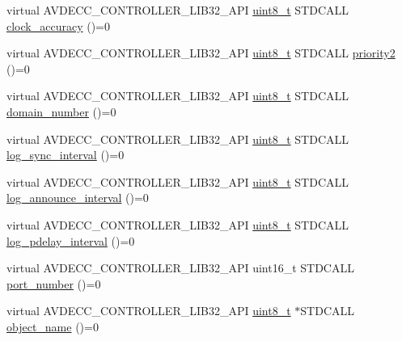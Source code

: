 \begin{DoxyCompactItemize}
\item 
virtual A\+V\+D\+E\+C\+C\+\_\+\+C\+O\+N\+T\+R\+O\+L\+L\+E\+R\+\_\+\+L\+I\+B32\+\_\+\+A\+PI \hyperlink{stdint_8h_aba7bc1797add20fe3efdf37ced1182c5}{uint8\+\_\+t} S\+T\+D\+C\+A\+LL \hyperlink{classavdecc__lib_1_1avb__interface__descriptor__response_acc3099d6effb85acd06976886ec7e9ec}{clock\+\_\+accuracy} ()=0
\item 
virtual A\+V\+D\+E\+C\+C\+\_\+\+C\+O\+N\+T\+R\+O\+L\+L\+E\+R\+\_\+\+L\+I\+B32\+\_\+\+A\+PI \hyperlink{stdint_8h_aba7bc1797add20fe3efdf37ced1182c5}{uint8\+\_\+t} S\+T\+D\+C\+A\+LL \hyperlink{classavdecc__lib_1_1avb__interface__descriptor__response_a8c7f27f9936745eaf35d7b1e3d2a312a}{priority2} ()=0
\item 
virtual A\+V\+D\+E\+C\+C\+\_\+\+C\+O\+N\+T\+R\+O\+L\+L\+E\+R\+\_\+\+L\+I\+B32\+\_\+\+A\+PI \hyperlink{stdint_8h_aba7bc1797add20fe3efdf37ced1182c5}{uint8\+\_\+t} S\+T\+D\+C\+A\+LL \hyperlink{classavdecc__lib_1_1avb__interface__descriptor__response_afe2d2e5bfaef60c810adead040d141c3}{domain\+\_\+number} ()=0
\item 
virtual A\+V\+D\+E\+C\+C\+\_\+\+C\+O\+N\+T\+R\+O\+L\+L\+E\+R\+\_\+\+L\+I\+B32\+\_\+\+A\+PI \hyperlink{stdint_8h_aba7bc1797add20fe3efdf37ced1182c5}{uint8\+\_\+t} S\+T\+D\+C\+A\+LL \hyperlink{classavdecc__lib_1_1avb__interface__descriptor__response_a7b48b137474a0b9cc94dbc77cf807921}{log\+\_\+sync\+\_\+interval} ()=0
\item 
virtual A\+V\+D\+E\+C\+C\+\_\+\+C\+O\+N\+T\+R\+O\+L\+L\+E\+R\+\_\+\+L\+I\+B32\+\_\+\+A\+PI \hyperlink{stdint_8h_aba7bc1797add20fe3efdf37ced1182c5}{uint8\+\_\+t} S\+T\+D\+C\+A\+LL \hyperlink{classavdecc__lib_1_1avb__interface__descriptor__response_aa99e9ae52d9f883d9d7128e273a74293}{log\+\_\+announce\+\_\+interval} ()=0
\item 
virtual A\+V\+D\+E\+C\+C\+\_\+\+C\+O\+N\+T\+R\+O\+L\+L\+E\+R\+\_\+\+L\+I\+B32\+\_\+\+A\+PI \hyperlink{stdint_8h_aba7bc1797add20fe3efdf37ced1182c5}{uint8\+\_\+t} S\+T\+D\+C\+A\+LL \hyperlink{classavdecc__lib_1_1avb__interface__descriptor__response_a641cffe922b9b057ba80fdc51a028302}{log\+\_\+pdelay\+\_\+interval} ()=0
\item 
virtual A\+V\+D\+E\+C\+C\+\_\+\+C\+O\+N\+T\+R\+O\+L\+L\+E\+R\+\_\+\+L\+I\+B32\+\_\+\+A\+PI uint16\+\_\+t S\+T\+D\+C\+A\+LL \hyperlink{classavdecc__lib_1_1avb__interface__descriptor__response_a1a239ddd0768d4a439a05a6ecc861e8c}{port\+\_\+number} ()=0
\item 
virtual A\+V\+D\+E\+C\+C\+\_\+\+C\+O\+N\+T\+R\+O\+L\+L\+E\+R\+\_\+\+L\+I\+B32\+\_\+\+A\+PI \hyperlink{stdint_8h_aba7bc1797add20fe3efdf37ced1182c5}{uint8\+\_\+t} $\ast$S\+T\+D\+C\+A\+LL \hyperlink{classavdecc__lib_1_1descriptor__response__base_a133f7774946d80f82b8aaaa4cfbb7361}{object\+\_\+name} ()=0
\end{DoxyCompactItemize}



